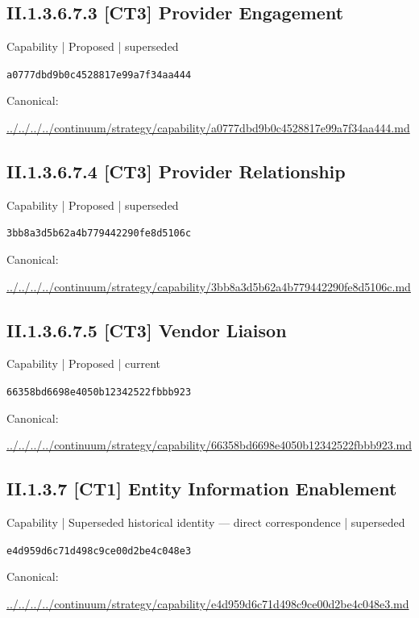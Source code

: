 \documentclass[10pt,a4paper]{article}
\begin{document}
\subsection*{II.1.3.6.7.3 [CT3] Provider Engagement}
{\small Capability | Proposed | superseded}\par
\texttt{a0777dbd9b0c4528817e99a7f34aa444}\par
Canonical: \par
{\footnotesize\url{../../../../continuum/strategy/capability/a0777dbd9b0c4528817e99a7f34aa444.md}}\par
\subsection*{II.1.3.6.7.4 [CT3] Provider Relationship}
{\small Capability | Proposed | superseded}\par
\texttt{3bb8a3d5b62a4b779442290fe8d5106c}\par
Canonical: \par
{\footnotesize\url{../../../../continuum/strategy/capability/3bb8a3d5b62a4b779442290fe8d5106c.md}}\par
\subsection*{II.1.3.6.7.5 [CT3] Vendor Liaison}
{\small Capability | Proposed | current}\par
\texttt{66358bd6698e4050b12342522fbbb923}\par
Canonical: \par
{\footnotesize\url{../../../../continuum/strategy/capability/66358bd6698e4050b12342522fbbb923.md}}\par
\subsection*{II.1.3.7 [CT1] Entity Information Enablement}
{\small Capability | Superseded historical identity — direct correspondence | superseded}\par
\texttt{e4d959d6c71d498c9ce00d2be4c048e3}\par
Canonical: \par
{\footnotesize\url{../../../../continuum/strategy/capability/e4d959d6c71d498c9ce00d2be4c048e3.md}}\par
\end{document}
